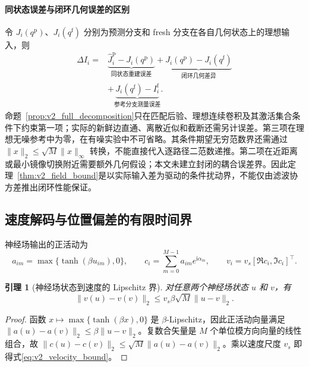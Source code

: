 \documentclass[UTF8,fontset=windows,11pt]{ctexart}
\newtheorem{lemma}[theorem]{引理}
\begin{document}
\paragraph{同状态误差与闭环几何误差的区别}
令 $J_i(q^{\mathrm p})$、$J_i(q^{\mathrm f})$ 分别为预测分支和 fresh 分支在各自几何状态上的理想输入，则
\begin{equation}
\begin{aligned}
\Delta I_i={}&\underbrace{\widehat J_i^{\mathrm p}-J_i(q^{\mathrm p})}_{\text{同状态重建误差}}
+\underbrace{J_i(q^{\mathrm p})-J_i(q^{\mathrm f})}_{\text{闭环几何差异}}\\
&+\underbrace{J_i(q^{\mathrm f})-I_i^{\mathrm f}}_{\text{参考分支测量误差}}.
\end{aligned}
\label{eq:geometry_feedback_gap}
\end{equation}
命题~\ref{prop:v2_full_decomposition}只在匹配后验、理想连续卷积及其激活集合条件下约束第一项；实际的新鲜边直通、离散近似和截断还需另计误差。第三项在理想无噪参考中为零，在有噪实验中不可省略。其条件期望无穷范数界还需通过 $\|x\|_2\le\sqrt M\|x\|_\infty$ 转换，不能直接代入逐路径二范数递推。第二项在近距离或最小镜像切换附近需要额外几何假设；本文未建立封闭的耦合误差界。因此定理~\ref{thm:v2_field_bound}是以实际输入差为驱动的条件扰动界，不能仅由滤波协方差推出闭环性能保证。

\subsection{速度解码与位置偏差的有限时间界}

神经场输出的正活动为
\begin{equation}
 a_{im}=\max\{\tanh(\beta u_{im}),0\},
 \qquad
 c_i=\sum_{m=0}^{M-1}a_{im}e^{\mathrm i\alpha_m},
 \qquad
 v_i=v_s[\Re c_i,\Im c_i]^{\top}.
 \label{eq:v2_velocity_decode}
\end{equation}

\begin{lemma}[神经场状态到速度的 Lipschitz 界]
\label{lem:v2_velocity_bound}
对任意两个神经场状态 $u$ 和 $v$，有
\begin{equation}
 \|v(u)-v(v)\|_2
 \le v_s\beta\sqrt M\|u-v\|_2.
 \label{eq:v2_velocity_bound}
\end{equation}
\end{lemma}

\begin{proof}
函数 $x\mapsto\max\{\tanh(\beta x),0\}$ 是 $\beta$-Lipschitz，因此正活动向量满足
\(\|a(u)-a(v)\|_2\le\beta\|u-v\|_2\)。复数合矢量是 $M$ 个单位模方向向量的线性组合，故
\(\|c(u)-c(v)\|_2\le\sqrt M\|a(u)-a(v)\|_2\)。乘以速度尺度 $v_s$ 即得式\eqref{eq:v2_velocity_bound}。
\end{proof}
\end{document}
